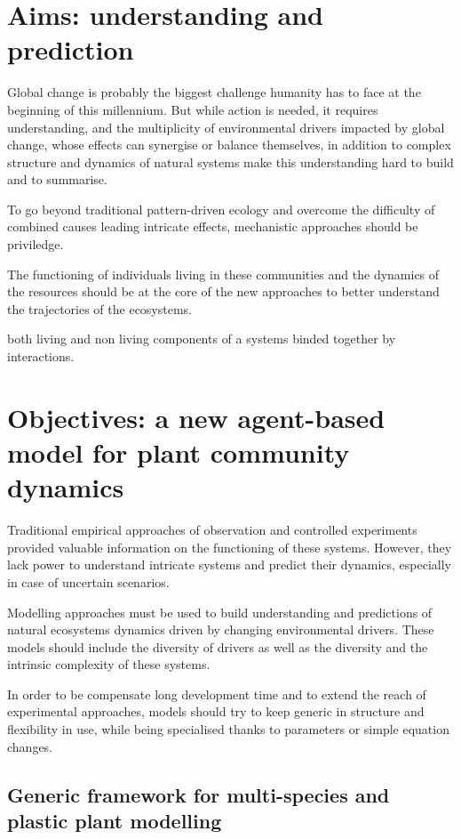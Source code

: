 \section{Aims: understanding and prediction}

Global change is probably the biggest challenge humanity has to face at the beginning of this millennium. But while action is needed, it requires understanding, and the multiplicity of environmental drivers impacted by global change, whose effects can synergise or balance themselves, in addition to complex structure and dynamics of natural systems make this understanding hard to build and to summarise.

To go beyond traditional pattern-driven ecology and overcome the difficulty of combined causes leading intricate effects, mechanistic approaches should be priviledge. 

The functioning of individuals living in these communities and the dynamics of the resources should be at the core of the new approaches to better understand the trajectories of the ecosystems.

 both living and non living components of a systems binded together by interactions. 
%

\section{Objectives: a new agent-based model for plant community dynamics} %
Traditional empirical approaches of observation and controlled experiments provided valuable information on the functioning of these systems. However, they lack power to understand intricate systems and predict their dynamics, especially in case of uncertain scenarios. 

Modelling approaches must be used to build understanding and predictions of natural ecosystems dynamics driven by changing environmental drivers. These models should include the diversity of drivers as well as the diversity and the intrinsic complexity of these systems.

In order to be compensate long development time and to extend the reach of experimental approaches, models should try to keep generic in structure and flexibility in use, while being specialised thanks to parameters or simple equation changes.

\subsection{Generic framework for multi-species and plastic plant modelling} %

